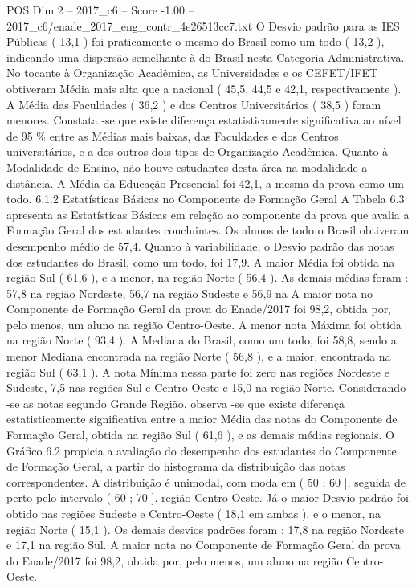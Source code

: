 \begin{textsample}{POS Dim 2 – 2017\_c6 – Score -1.00 – 2017\_c6/enade\_2017\_eng\_contr\_4e26513cc7.txt}
O Desvio padrão para as IES Públicas ( 13,1 ) foi praticamente o mesmo do Brasil como um todo ( 13,2 ), indicando uma dispersão semelhante à do Brasil nesta Categoria Administrativa.
No tocante à Organização Acadêmica, as Universidades e os CEFET/IFET obtiveram Média mais alta que a nacional ( 45,5, 44,5 e 42,1, respectivamente ).
A Média das Faculdades ( 36,2 ) e dos Centros Universitários ( 38,5 ) foram menores.
Constata -se que existe diferença estatisticamente significativa ao nível de 95 \% entre as Médias mais baixas, das Faculdades e dos Centros universitários, e a dos outros dois tipos de Organização Acadêmica.
Quanto à Modalidade de Ensino, não houve estudantes desta área na modalidade a distância.
A Média da Educação Presencial foi 42,1, a mesma da prova como um todo. 6.1.2 Estatísticas Básicas no Componente de Formação Geral A Tabela 6.3 apresenta as Estatísticas Básicas em relação ao componente da prova que avalia a Formação Geral dos estudantes concluintes.
Os alunos de todo o Brasil obtiveram desempenho médio de 57,4.
Quanto à variabilidade, o Desvio padrão das notas dos estudantes do Brasil, como um todo, foi 17,9.
A maior Média foi obtida na região Sul ( 61,6 ), e a menor, na região Norte ( 56,4 ).
As demais médias foram : 57,8 na região Nordeste, 56,7 na região Sudeste e 56,9 na A maior nota no Componente de Formação Geral da prova do Enade/2017 foi 98,2, obtida por, pelo menos, um aluno na região Centro-Oeste.
A menor nota Máxima foi obtida na região Norte ( 93,4 ).
A Mediana do Brasil, como um todo, foi 58,8, sendo a menor Mediana encontrada na região Norte ( 56,8 ), e a maior, encontrada na região Sul ( 63,1 ).
A nota Mínima nessa parte foi zero nas regiões Nordeste e Sudeste, 7,5 nas regiões Sul e Centro-Oeste e 15,0 na região Norte.
Considerando -se as notas segundo Grande Região, observa -se que existe diferença estatisticamente significativa entre a maior Média das notas do Componente de Formação Geral, obtida na região Sul ( 61,6 ), e as demais médias regionais.
O Gráfico 6.2 propicia a avaliação do desempenho dos estudantes do Componente de Formação Geral, a partir do histograma da distribuição das notas correspondentes.
A distribuição é unimodal, com moda em ( 50 ; 60 ], seguida de perto pelo intervalo ( 60 ; 70 ]. região Centro-Oeste.
Já o maior Desvio padrão foi obtido nas regiões Sudeste e Centro-Oeste ( 18,1 em ambas ), e o menor, na região Norte ( 15,1 ).
Os demais desvios padrões foram : 17,8 na região Nordeste e 17,1 na região Sul.
A maior nota no Componente de Formação Geral da prova do Enade/2017 foi 98,2, obtida por, pelo menos, um aluno na região Centro-Oeste.

\end{textsample}

